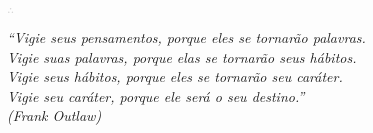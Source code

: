 \documentclass[
    a4paper,        %
    12pt,           %
    oneside,        %
    openright,      %
    final,          %
    sumario=tradicional, %
    english,        %
    french,         %
    spanish,        %
    brazil          %
    ]{abntex2}
\begin{document}
\begin{epigrafe}
    \vspace*{0.4\textheight}
    \begin{center}
        \textcolor{lightgray}{\( \therefore \)}
    \end{center}
    \vspace*{\fill}

    \hspace{3.9cm}
    \begin{minipage}{10.5cm}
        \noindent
        \raggedleft{}
        \emph{``Vigie seus pensamentos, porque eles se tornarão palavras.\\
            Vigie suas palavras, porque elas se tornarão seus hábitos.\\
            Vigie seus hábitos, porque eles se tornarão seu caráter.\\
            Vigie seu caráter, porque ele será o seu destino.''}\\
        \raggedleft{} \emph{(Frank Outlaw)}
    \end{minipage}

    \vspace*{1cm}
\end{epigrafe}
\end{document}

